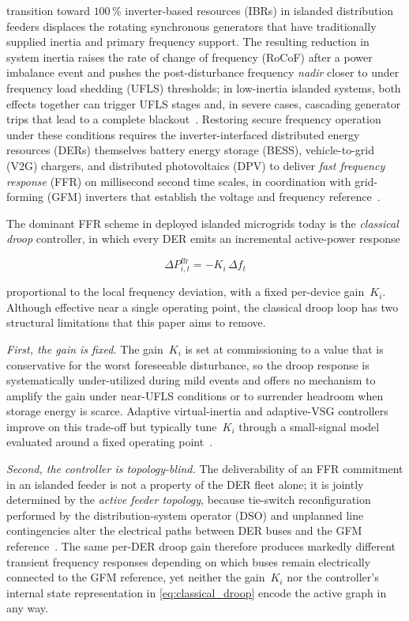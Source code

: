 \documentclass[lettersize,journal]{IEEEtran}
\begin{document}
 transition toward $100$\,\% inverter-based resources (IBRs) in islanded distribution feeders displaces the rotating synchronous generators that have traditionally supplied inertia and primary frequency support. The resulting reduction in system inertia raises the rate of change of frequency (RoCoF) after a power imbalance event and pushes the post-disturbance frequency \emph{nadir} closer to under frequency load shedding (UFLS) thresholds; in low-inertia islanded systems, both effects together can trigger UFLS stages and, in severe cases, cascading generator trips that lead to a complete blackout~\cite{shobug2024vicreview,roy2022overview,khayat2021virtual}. Restoring secure frequency operation under these conditions requires the inverter-interfaced distributed energy resources (DERs) themselves battery energy storage (BESS), vehicle-to-grid (V2G) chargers, and distributed photovoltaics (DPV) to deliver \emph{fast frequency response} (FFR) on millisecond second time scales, in coordination with grid-forming (GFM) inverters that establish the voltage and frequency reference~\cite{lin2022field,bakeer2024bidirectional,perez2023adaptive,salem2025gfmreview}.

The dominant FFR scheme in deployed islanded microgrids today is the \emph{classical droop} controller, in which every DER emits an incremental active-power response


\begin{equation}
\Delta P^{\mathrm{ffr}}_{i,t}=-K_i\,\Delta f_t
\label{eq:classical_droop}
\end{equation}


proportional to the local frequency deviation, with a fixed per-device gain~$K_i$. Although effective near a single operating point, the classical droop loop has two structural limitations that this paper aims to remove.

\emph{First, the gain is fixed.} The gain~$K_i$ is set at commissioning to a value that is conservative for the worst foreseeable disturbance, so the droop response is systematically under-utilized during mild events and offers no mechanism to amplify the gain under near-UFLS conditions or to surrender headroom when storage energy is scarce. Adaptive virtual-inertia and adaptive-VSG controllers improve on this trade-off but typically tune~$K_i$ through a small-signal model evaluated around a fixed operating point~\cite{boutfarjoute2025fuzzy,kerdphol2017robust,saxena2020derivative}.

\emph{Second, the controller is topology-blind.} The deliverability of an FFR commitment in an islanded feeder is not a property of the DER fleet alone; it is jointly determined by the \emph{active feeder topology}, because tie-switch reconfiguration performed by the distribution-system operator (DSO) and unplanned line contingencies alter the electrical paths between DER buses and the GFM reference~\cite{mohyuddin2022dsovpp,jacob2024outage}. The same per-DER
droop gain therefore produces markedly different transient frequency responses depending on which buses remain electrically connected to the GFM reference, yet neither the gain~$K_i$ nor the controller's internal state  representation in \eqref{eq:classical_droop} encode the active graph in any way.
\end{document}
